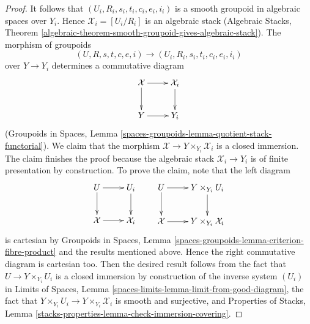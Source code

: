 \documentclass[10pt,a4paper]{amsart}
\theoremstyle{plain}
\theoremstyle{definition}
\theoremstyle{remark}
\numberwithin{equation}{subsection}
\begin{document}
\begin{proof}
\medskip\noindent
It follows that $(U_i, R_i, s_i, t_i, c_i, e_i, i_i)$
is a smooth groupoid in algebraic spaces over $Y_i$.
Hence $\mathcal{X}_i = [U_i/R_i]$ is an algebraic stack
(Algebraic Stacks, Theorem
\ref{algebraic-theorem-smooth-groupoid-gives-algebraic-stack}).
The morphism of groupoids
$$
(U, R, s, t, c, e, i) \to (U_i, R_i, s_i, t_i, c_i, e_i, i_i)
$$
over $Y \to Y_i$ determines a commutative diagram
$$
\xymatrix{
\mathcal{X} \ar[d] \ar[r] & \mathcal{X}_i \ar[d] \\
Y \ar[r] & Y_i
}
$$
(Groupoids in Spaces, Lemma
\ref{spaces-groupoids-lemma-quotient-stack-functorial}).
We claim that the morphism $\mathcal{X} \to Y \times_{Y_i} \mathcal{X}_i$
is a closed immersion. The claim finishes the proof because
the algebraic stack $\mathcal{X}_i \to Y_i$ is of finite presentation
by construction. To prove the claim, note that the left diagram
$$
\xymatrix{
U \ar[d] \ar[r] & U_i \ar[d] \\
\mathcal{X} \ar[r] & \mathcal{X}_i
}
\quad\quad
\xymatrix{
U \ar[d] \ar[r] & Y \times_{Y_i} U_i \ar[d] \\
\mathcal{X} \ar[r] & Y \times_{Y_i} \mathcal{X}_i
}
$$
is cartesian by Groupoids in Spaces, Lemma
\ref{spaces-groupoids-lemma-criterion-fibre-product}
and the results mentioned above.
Hence the right commutative diagram is cartesian too.
Then the desired result follows from the fact that
$U \to Y \times_{Y_i} U_i$ is a closed immersion
by construction of the inverse system $(U_i)$ in
Limits of Spaces, Lemma \ref{spaces-limits-lemma-limit-from-good-diagram},
the fact that $Y \times_{Y_i} U_i \to Y \times_{Y_i} \mathcal{X}_i$
is smooth and surjective, and Properties of Stacks, Lemma
\ref{stacks-properties-lemma-check-immersion-covering}.
\end{proof}



\end{document}
